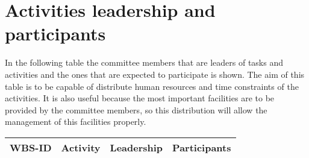 \section{Activities leadership and participants}
In the following table the committee members that are leaders of tasks and activities and the ones that are expected to participate is shown. The aim of this table is to be capable of distribute human resources and time constraints of the activities. It is also useful because the most important facilities are to be provided by the committee members, so this distribution will allow the management of this facilities properly. 

\begin{longtable}[H]{l p{4cm} p{3.8cm} p{4cm}}
	\toprule[2pt]
	\textbf{WBS-ID} &  \textbf{Activity}  & \textbf{Leadership} & \textbf{Participants} \\ 
	\midrule [1.5pt]
	\endhead
	

\end{longtable}
